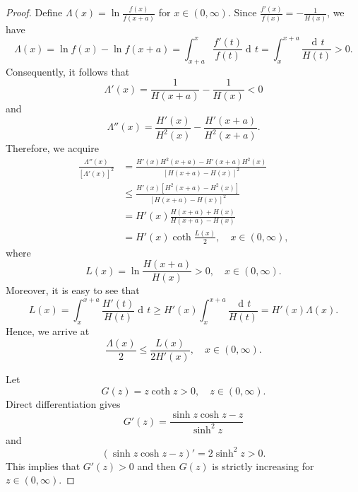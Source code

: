 \documentclass[10pt,a4paper]{amsart}
\DeclareMathOperator{\td}{d\!}
\begin{document}
\begin{proof}
Define $\Lambda(x)=\ln\frac{f(x)}{f(x+a)}$ for $x\in(0,\infty)$.
Since $\frac{f'(x)}{f(x)}=-\frac1{H(x)}$, we have
$$
\Lambda(x)=\ln f(x)-\ln f(x+a)
=\int_{x+a}^{x}\frac{f'(t)}{f(t)}\td t
=
\int_x^{x+a}\frac{\td t}{H(t)}>0.
$$
Consequently, it follows that
$$
\Lambda'(x)=\frac1{H(x+a)}-\frac1{H(x)}<0
$$
and
$$
\Lambda''(x)
=\frac{H'(x)}{H^2(x)}-\frac{H'(x+a)}{H^2(x+a)}.
$$
Therefore, we acquire
\begin{equation}\label{eq:lambda-bound}
\begin{aligned}
\frac{\Lambda''(x)}{[\Lambda'(x)]^2}
&=\frac{H'(x)H^2(x+a)-H'(x+a)H^2(x)}{[H(x+a)-H(x)]^2}\\
&\leq \frac{H'(x)[H^2(x+a)-H^2(x)]}{[H(x+a)-H(x)]^2}\\
&=H'(x)\frac{H(x+a)+H(x)}{H(x+a)-H(x)}\\
&=H'(x)\coth\frac{L(x)}{2}, \quad x\in(0,\infty),
\end{aligned}
\end{equation}
where
$$
L(x)=\ln\frac{H(x+a)}{H(x)}>0, \quad x\in(0,\infty).
$$
Moreover, it is easy to see that
$$
L(x)=\int_x^{x+a}\frac{H'(t)}{H(t)}\td t
\geq H'(x)\int_x^{x+a}\frac{\td t}{H(t)}
=H'(x)\Lambda(x).
$$
Hence, we arrive at
\begin{equation}\label{LL-ineq}
\frac{\Lambda(x)}{2}\leq\frac{L(x)}{2H'(x)}, \quad x\in(0,\infty).
\end{equation}
\par
Let
$$
G(z)=z\coth z>0, \quad z\in(0,\infty).
$$
Direct differentiation gives
$$
G'(z)=\frac{\sinh z\cosh z-z}{\sinh^2z}
$$
and
$$
(\sinh z\cosh z-z)'=2\sinh^2z>0.
$$
This implies that $G'(z)>0$ and then $G(z)$ is strictly increasing for $z\in(0,\infty)$.


\end{proof}
\end{document}
